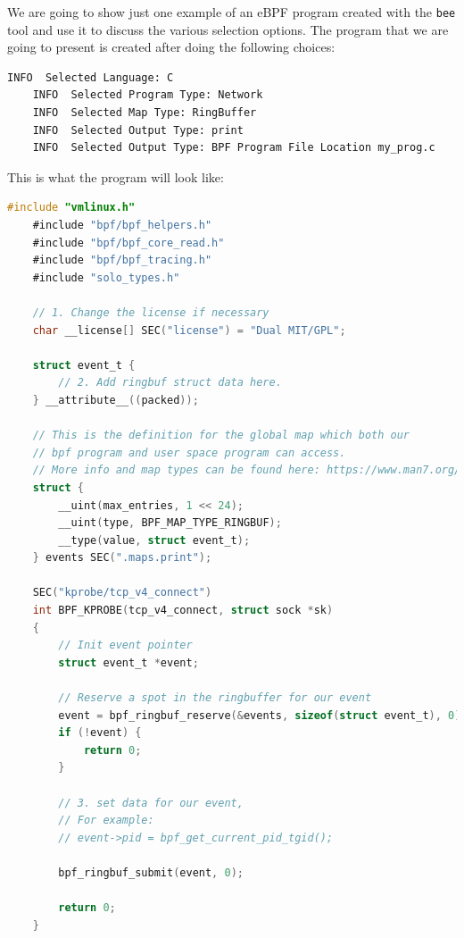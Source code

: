 We are going to show just one example of an eBPF program created with the \colorbox{backcolour}{\lstinline[style=commandline, language=bash, breaklines=true]|bee|} tool and use it to discuss the various selection options.
The program that we are going to present is created after doing the following choices:

\begin{lstlisting}[style=commandline, language=bash, caption={Choices to create our first program using \colorbox{backcolour}{\lstinline[style=commandline, language=bash]|bee|}.}]
	INFO  Selected Language: C
	INFO  Selected Program Type: Network
	INFO  Selected Map Type: RingBuffer
	INFO  Selected Output Type: print
	INFO  Selected Output Type: BPF Program File Location my_prog.c
\end{lstlisting}

This is what the program will look like:

\begin{lstlisting}[style=cstyle, language=C, caption={Code of the first program created using \colorbox{backcolour}{\lstinline[style=commandline, language=bash]|bee|}.}]
	#include "vmlinux.h"
	#include "bpf/bpf_helpers.h"
	#include "bpf/bpf_core_read.h"
	#include "bpf/bpf_tracing.h"
	#include "solo_types.h"
	
	// 1. Change the license if necessary 
	char __license[] SEC("license") = "Dual MIT/GPL";
	
	struct event_t {
		// 2. Add ringbuf struct data here.
	} __attribute__((packed));
	
	// This is the definition for the global map which both our
	// bpf program and user space program can access.
	// More info and map types can be found here: https://www.man7.org/linux/man-pages/man2/bpf.2.html
	struct {
		__uint(max_entries, 1 << 24);
		__uint(type, BPF_MAP_TYPE_RINGBUF);
		__type(value, struct event_t);
	} events SEC(".maps.print");
	
	SEC("kprobe/tcp_v4_connect")
	int BPF_KPROBE(tcp_v4_connect, struct sock *sk)
	{
		// Init event pointer
		struct event_t *event;
		
		// Reserve a spot in the ringbuffer for our event
		event = bpf_ringbuf_reserve(&events, sizeof(struct event_t), 0);
		if (!event) {
			return 0;
		}
		
		// 3. set data for our event,
		// For example:
		// event->pid = bpf_get_current_pid_tgid();
		
		bpf_ringbuf_submit(event, 0);
		
		return 0;
	}
\end{lstlisting}

